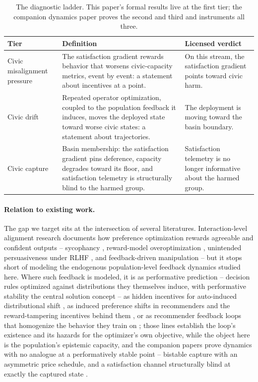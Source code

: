 \documentclass[11pt]{article}
\theoremstyle{definition}
\theoremstyle{remark}
\numberwithin{equation}{section}
\begin{document}
\begin{table}[t]
\centering\small
\begin{tabular}{>{\raggedright\arraybackslash}p{2.6cm}>{\raggedright\arraybackslash}p{7.2cm}>{\raggedright\arraybackslash}p{4.4cm}}
\toprule
Tier & Definition & Licensed verdict \\
\midrule
Civic misalignment pressure & The satisfaction gradient rewards behavior that worsens civic-capacity metrics, event by event: a statement about incentives at a point. & On this stream, the satisfaction gradient points toward civic harm. \\
Civic drift & Repeated operator optimization, coupled to the population feedback it induces, moves the deployed state toward worse civic states: a statement about trajectories. & The deployment is moving toward the basin boundary. \\
Civic capture & Basin membership: the satisfaction gradient pins deference, capacity degrades toward its floor, and satisfaction telemetry is structurally blind to the harmed group. & Satisfaction telemetry is no longer informative about the harmed group. \\
\bottomrule
\end{tabular}
\caption{The diagnostic ladder. This paper's formal results live at the first tier; the companion dynamics paper proves the second and third and instruments all three.}
\label{tab:tiers}
\end{table}

\paragraph{Relation to existing work.} The gap we target sits at the intersection of several literatures. Interaction-level alignment research documents how preference optimization rewards agreeable and confident outputs -- sycophancy \citep{perez2022discovering, sharma2024towards}, reward-model overoptimization \citep{gao2023scaling, casper2023open}, unintended persuasiveness under RLHF \citep{wen2025language}, and feedback-driven manipulation \citep{williams2025targeted} -- but it stops short of modeling the endogenous population-level feedback dynamics studied here. Where such feedback is modeled, it is as performative prediction -- decision rules optimized against distributions they themselves induce, with performative stability the central solution concept \citep{perdomo2020performative, hardt2023performative} -- as hidden incentives for auto-induced distributional shift \citep{krueger2020hidden}, as induced preference shifts in recommenders and the reward-tampering incentives behind them \citep{carroll2022estimating, everitt2021reward}, or as recommender feedback loops that homogenize the behavior they train on \citep{chaney2018algorithmic, jiang2019degenerate}; those lines establish the loop's existence and its hazards for the optimizer's own objective, while the object here is the population's epistemic capacity, and the companion papers prove dynamics with no analogue at a performatively stable point -- bistable capture with an asymmetric price schedule, and a satisfaction channel structurally blind at exactly the captured state \citep{hofheinz2026drift, hofheinz2026loops}.
\end{document}
